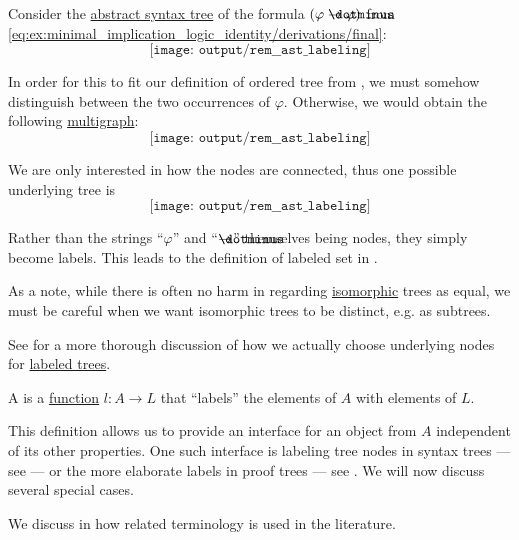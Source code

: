 \begin{remark}\label{rem:ast_labeling}
  Consider the \hyperref[def:propositional_syntax/formula_ast]{abstract syntax tree} of the formula \( (\varphi \synimplies \varphi) \) from \eqref{eq:ex:minimal_implication_logic_identity/derivations/final}:
  \begin{equation*}
    \texttt{[image: output/rem\_\_ast\_labeling]}
  \end{equation*}

  In order for this to fit our definition of ordered tree from , we must somehow distinguish between the two occurrences of \( \varphi \). Otherwise, we would obtain the following \hyperref[def:hypergraph/multigraph]{multigraph}:
  \begin{equation*}
    \texttt{[image: output/rem\_\_ast\_labeling]}
  \end{equation*}

  We are only interested in how the nodes are connected, thus one possible underlying tree is
  \begin{equation*}
    \texttt{[image: output/rem\_\_ast\_labeling]}
  \end{equation*}

  Rather than the strings \enquote{\( \varphi \)} and \enquote{\( \synimplies \)} themselves being nodes, they simply become labels. This leads to the definition of labeled set in .

  As a note, while there is often no harm in regarding \hyperref[def:labeled_tree/homomorphism]{isomorphic} trees as equal, we must be careful when we want isomorphic trees to be distinct, e.g. as subtrees.
\end{remark}
\begin{comments}
  \item See  for a more thorough discussion of how we actually choose underlying nodes for \hyperref[def:labeled_tree]{labeled trees}.
\end{comments}

\begin{definition}\label{def:labeled_set}\mimprovised
  A  is a \hyperref[def:function]{function} \( l: A \to L \) that \enquote{labels} the elements of \( A \) with elements of \( L \).
\end{definition}
\begin{comments}
  \item This definition allows us to provide an interface for an object from \( A \) independent of its other properties. One such interface is labeling tree nodes in syntax trees --- see  --- or the more elaborate labels in proof trees --- see . We will now discuss several special cases.

  \item We discuss in  how related terminology is used in the literature.
\end{comments}

